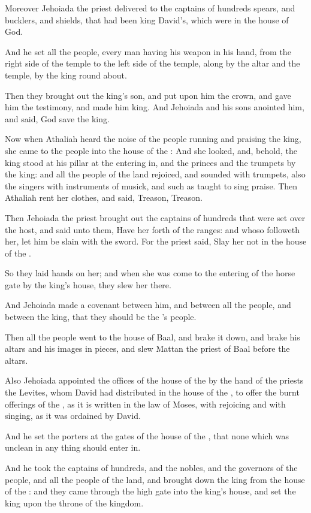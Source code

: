 \Verse Moreover Jehoiada the priest delivered to the captains of hundreds spears, and bucklers, and shields, that had been king David's, which were in the house of God.

\Verse And he set all the people, every man having his weapon in his hand, from the right side of the temple to the left side of the temple, along by the altar and the temple, by the king round about.

\Verse Then they brought out the king's son, and put upon him the crown, and gave him the testimony, and made him king. And Jehoiada and his sons anointed him, and said, God save the king.

\Verse Now when Athaliah heard the noise of the people running and praising the king, she came to the people into the house of the \LORD: \Verse And she looked, and, behold, the king stood at his pillar at the entering in, and the princes and the trumpets by the king: and all the people of the land rejoiced, and sounded with trumpets, also the singers with instruments of musick, and such as taught to sing praise.  Then Athaliah rent her clothes, and said, Treason, Treason.

\Verse Then Jehoiada the priest brought out the captains of hundreds that were set over the host, and said unto them, Have her forth of the ranges: and whoso followeth her, let him be slain with the sword. For the priest said, Slay her not in the house of the \LORD.

\Verse So they laid hands on her; and when she was come to the entering of the horse gate by the king's house, they slew her there.

\Verse And Jehoiada made a covenant between him, and between all the people, and between the king, that they should be the \LORD's people.

\Verse Then all the people went to the house of Baal, and brake it down, and brake his altars and his images in pieces, and slew Mattan the priest of Baal before the altars.

\Verse Also Jehoiada appointed the offices of the house of the \LORD by the hand of the priests the Levites, whom David had distributed in the house of the \LORD, to offer the burnt offerings of the \LORD, as it is written in the law of Moses, with rejoicing and with singing, as it was ordained by David.

\Verse And he set the porters at the gates of the house of the \LORD, that none which was unclean in any thing should enter in.

\Verse And he took the captains of hundreds, and the nobles, and the governors of the people, and all the people of the land, and brought down the king from the house of the \LORD: and they came through the high gate into the king's house, and set the king upon the throne of the kingdom.

